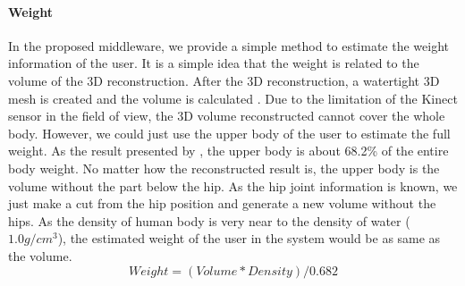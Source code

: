 \paragraph{Weight}
In the proposed middleware, we provide a simple method to estimate the weight information of the user. It is a simple idea that the weight is related to the volume of the 3D reconstruction. After the 3D reconstruction, a watertight 3D mesh is created and the volume is calculated \cite{Qiao2015}.
Due to the limitation of the Kinect sensor in the field of view, the 3D volume reconstructed cannot cover the whole body. However, we could just use the upper body of the user to estimate the full weight. As the result presented by \cite{Tozeren2000}, the upper body is about 68.2\% of the entire body weight. 
No matter how the reconstructed result is, the upper body is the volume without the part below the hip. As the hip joint information is known, we just make a cut from the hip position and generate a new volume without the hips.
As the density of human body is very near to the density of water ($1.0 g/cm^3$), the estimated weight of the user in the system would be as same as the volume.
\begin{equation}
Weight = (Volume * Density)/0.682
\end{equation}

